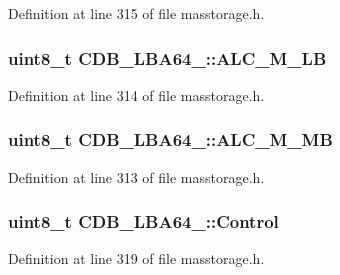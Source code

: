 \-Definition at line 315 of file masstorage.\-h.

\hypertarget{struct_c_d_b___l_b_a64__16_a61acd48736824f7a82f23e3dd52a3233}{
\subsubsection[{\-A\-L\-C\-\_\-\-M\-\_\-\-L\-B}]{\setlength{\rightskip}{0pt plus 5cm}uint8\-\_\-t {\bf \-C\-D\-B\-\_\-\-L\-B\-A64\-\_\-::\-A\-L\-C\-\_\-\-M\-\_\-\-L\-B}}}\label{struct_c_d_b___l_b_a64__16_a61acd48736824f7a82f23e3dd52a3233}


\-Definition at line 314 of file masstorage.\-h.

\hypertarget{struct_c_d_b___l_b_a64__16_a9cf979f1acbdc8e11b29b1f9aa81c2f3}{
\subsubsection[{\-A\-L\-C\-\_\-\-M\-\_\-\-M\-B}]{\setlength{\rightskip}{0pt plus 5cm}uint8\-\_\-t {\bf \-C\-D\-B\-\_\-\-L\-B\-A64\-\_\-::\-A\-L\-C\-\_\-\-M\-\_\-\-M\-B}}}\label{struct_c_d_b___l_b_a64__16_a9cf979f1acbdc8e11b29b1f9aa81c2f3}


\-Definition at line 313 of file masstorage.\-h.

\hypertarget{struct_c_d_b___l_b_a64__16_ad40f82369182a1001877c7f8d818c418}{
\subsubsection[{\-Control}]{\setlength{\rightskip}{0pt plus 5cm}uint8\-\_\-t {\bf \-C\-D\-B\-\_\-\-L\-B\-A64\-\_\-::\-Control}}}\label{struct_c_d_b___l_b_a64__16_ad40f82369182a1001877c7f8d818c418}


\-Definition at line 319 of file masstorage.\-h.

